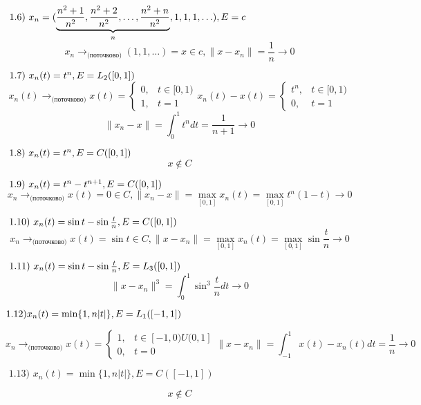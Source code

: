 \begin{tcolorbox}[title=Завдлання 1]
    $
    \text { 1.6) } x_{n}=(\underbrace{\frac{n^{2}+1}{n^{2}}, \frac{n^{2}+2}{n^{2}}, \ldots, \frac{n^{2}+n}{n^{2}}}_{n}, 1,1,1, \ldots), E=c \\
    $
    $$
    x_n \rightarrow_{\text{(поточково)}} (1, 1, \ldots) = x \in c, 
    \|x - x_n\| = \frac{1}{n} \rightarrow 0
    $$

    $
    \text { 1.7) } x_{n}(t)=t^{n}, E=L_{2}([0,1]) \\
    $
    $$
    x_n(t) \rightarrow_{\text{(поточково)}} x(t) = \begin{cases}
        0, & t \in [0, 1) \\
        1, & t = 1
    \end{cases}
    x_n(t) - x(t) = \begin{cases}
        t^n, & t \in [0, 1) \\
        0, & t = 1
    \end{cases} 
    $$
    $$
    \|x_n - x\| = \int_{0}^{1} t^n dt = \frac{1}{n + 1} \rightarrow 0
    $$
\end{tcolorbox}

\begin{tcolorbox}[title=Завдлання 1 ]

    $
    \text { 1.8) } x_{n}(t)=t^{n}, E=C([0,1]) \\
    $
    $$x \notin C$$

    $
    \text { 1.9) } x_{n}(t)=t^{n}-t^{n+1}, E=C([0,1]) \\
    $
    $$
    x_n \rightarrow_{\text{(поточково)}} x(t) = 0 \in C, 
    \|x_n - x\| = \max_{[0, 1]} x_n(t) = \max_{[0, 1]}t^n(1 - t) \rightarrow 0
    $$

    $
    \text { 1.10) } x_{n}(t)=\sin t-\sin \frac{t}{n}, E=C([0,1]) \\
    $
    $$
    x_n \rightarrow_{\text{(поточково)}} x(t) = \sin t \in C,
    \|x - x_n\| = \max_{[0, 1]} x_n(t) = \max_{[0, 1]}\sin \frac{t}{n} \rightarrow 0
    $$

    $
    \text { 1.11) } x_{n}(t)=\sin t-\sin \frac{t}{n}, E=L_{3}([0,1]) \\
    $
    $$
    \|x - x_n\|^3 = \int_{0}^{1} \sin^3 \frac{t}{n} dt \rightarrow 0
    $$

    $
    1.12) x_{n}(t)=\min \{1, n|t|\}, E=L_{1}([-1,1]) \\
    $

    $$
    x_n \rightarrow_{\text{(поточково)}} x(t) = \begin{cases}
        1, & t \in [-1, 0) U (0 , 1] \\
        0, & t = 0
    \end{cases}
    \|x - x_n\| = \int_{-1}^{1} x(t) - x_n(t) dt =
    \frac{1}{n} \rightarrow 0
    $$

    $
    \text { 1.13) } x_{n}(t)=\min \{1, n|t|\}, E=C([-1,1])
    $

    $$
    x\notin C
    $$


\end{tcolorbox}

